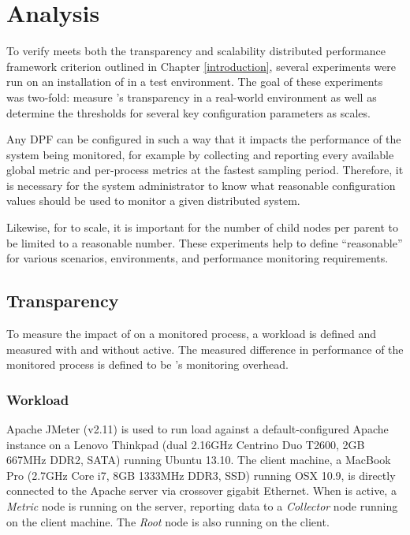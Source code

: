 \chapter{Analysis}
\label{analysis}

To verify \dcamp meets both the transparency and scalability distributed performance framework criterion outlined in
Chapter \ref{introduction}, several experiments were run on an installation of \dcamp in a test environment. The goal of
these experiments was two-fold: measure \dcampns's transparency in a real-world environment as well as determine the
thresholds for several key configuration parameters as \dcamp scales.

Any DPF can be configured in such a way that it impacts the performance of the system being monitored, for example by
collecting and reporting every available global metric and per-process metrics at the fastest sampling period.
Therefore, it is necessary for the system administrator to know what reasonable configuration values should be used to
monitor a given distributed system.

Likewise, for \dcamp to scale, it is important for the number of child nodes per parent to be limited to a reasonable
number. These experiments help to define ``reasonable'' for various scenarios, environments, and performance monitoring
requirements.

\section{Transparency}

To measure the impact of \dcamp on a monitored process, a workload is defined and measured with and without \dcamp
active. The measured difference in performance of the monitored process is defined to be \dcampns's monitoring overhead.

\subsection{Workload}

Apache JMeter\cite{jmeter} (v2.11) is used to run load against a default-configured Apache instance on a Lenovo Thinkpad
(dual 2.16GHz Centrino Duo T2600, 2GB 667MHz DDR2, SATA) running Ubuntu 13.10. The client machine, a MacBook Pro (2.7GHz
Core i7, 8GB 1333MHz DDR3, SSD) running OSX 10.9, is directly connected to the Apache server via crossover gigabit
Ethernet. When \dcamp is active, a \textit{Metric} node is running on the server, reporting data to a \textit{Collector}
node running on the client machine. The \textit{Root} node is also running on the client.

